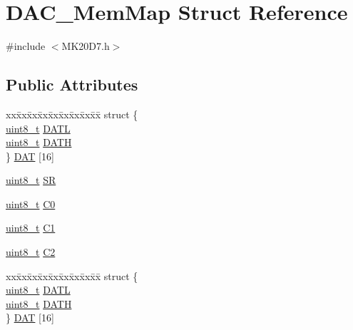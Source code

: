 \hypertarget{struct_d_a_c___mem_map}{}\section{D\+A\+C\+\_\+\+Mem\+Map Struct Reference}
\label{struct_d_a_c___mem_map}


{\ttfamily \#include $<$M\+K20\+D7.\+h$>$}

\subsection*{Public Attributes}
\begin{DoxyCompactItemize}
\item 
\begin{tabbing}
xx\=xx\=xx\=xx\=xx\=xx\=xx\=xx\=xx\=\kill
struct \{\\
\>\hyperlink{_p_e___types_8h_aba7bc1797add20fe3efdf37ced1182c5}{uint8\_t} \hyperlink{struct_d_a_c___mem_map_a5e154a0937bc5d4879efb1fd80f713f0}{DATL}\\
\>\hyperlink{_p_e___types_8h_aba7bc1797add20fe3efdf37ced1182c5}{uint8\_t} \hyperlink{struct_d_a_c___mem_map_ab05302bfcc5f26e258870c56bbdb52b8}{DATH}\\
\} \hyperlink{struct_d_a_c___mem_map_a99438365534b1317e59b49be22b12564}{DAT} \mbox{[}16\mbox{]}\\

\end{tabbing}\item 
\hyperlink{_p_e___types_8h_aba7bc1797add20fe3efdf37ced1182c5}{uint8\+\_\+t} \hyperlink{struct_d_a_c___mem_map_a146115dd60e5e34ce6f1d8dc2b860877}{SR}
\item 
\hyperlink{_p_e___types_8h_aba7bc1797add20fe3efdf37ced1182c5}{uint8\+\_\+t} \hyperlink{struct_d_a_c___mem_map_a101597fee641d461b61f0c02c90ef703}{C0}
\item 
\hyperlink{_p_e___types_8h_aba7bc1797add20fe3efdf37ced1182c5}{uint8\+\_\+t} \hyperlink{struct_d_a_c___mem_map_a29c8fe336000ac0b40c05c444be3bc1b}{C1}
\item 
\hyperlink{_p_e___types_8h_aba7bc1797add20fe3efdf37ced1182c5}{uint8\+\_\+t} \hyperlink{struct_d_a_c___mem_map_a8c2e7ea3f41f7b867578fdec48b4dacc}{C2}
\item 
\begin{tabbing}
xx\=xx\=xx\=xx\=xx\=xx\=xx\=xx\=xx\=\kill
struct \{\\
\>\hyperlink{_p_e___types_8h_aba7bc1797add20fe3efdf37ced1182c5}{uint8\_t} \hyperlink{struct_d_a_c___mem_map_a5e154a0937bc5d4879efb1fd80f713f0}{DATL}\\
\>\hyperlink{_p_e___types_8h_aba7bc1797add20fe3efdf37ced1182c5}{uint8\_t} \hyperlink{struct_d_a_c___mem_map_ab05302bfcc5f26e258870c56bbdb52b8}{DATH}\\
\} \hyperlink{struct_d_a_c___mem_map_a62b764c69e5c2c5e1f9e288308c52846}{DAT} \mbox{[}16\mbox{]}\\


\end{tabbing}
\end{DoxyCompactItemize}
